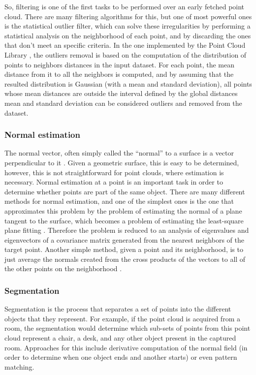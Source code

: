 \documentclass[msc, a4paper, classic, en]{ufbathesis}
\begin{document}
So, filtering is one of the first tasks to be performed over an early fetched point cloud. There are many filtering algorithms for this, but one of most powerful ones is the statistical outlier filter, which can solve these irregularities by performing a statistical analysis on the neighborhood of each point, and by discarding the ones that don't meet an specific criteria. In the one implemented by the Point Cloud Library \cite{pclstatout}, the outliers removal is based on the computation of the distribution of points to neighbors distances in the input dataset. For each point, the mean distance from it to all the neighbors is computed, and by assuming that the resulted distribution is Gaussian (with a mean and standard deviation), all points whose mean distances are outside the interval defined by the global distances mean and standard deviation can be considered outliers and removed from the dataset.

\subsubsection{Normal estimation}

The normal vector, often simply called the ``normal'' to a surface is a vector perpendicular to it \cite{normalwolf}. Given a geometric surface, this is easy to be determined, however, this is not straightforward for point clouds, where estimation is necessary. Normal estimation at a point is an important task in order to determine whether points are part of the same object. There are many different methods for normal estimation, and one of the simplest ones is the one that approximates this problem by the problem of estimating the normal of a plane tangent to the surface, which becomes a problem of estimating the least-square plane fitting \cite{pclnormal}. Therefore the problem is reduced to an analysis of eigenvalues and eigenvectors of a covariance matrix generated from the nearest neighbors of the target point. Another simple method, given a point and its neighborhood, is to just average the normals created from the cross products of the vectors to all of the other points on the neighborhood \cite{price2012}.

\subsubsection{Segmentation}

Segmentation is the process that separates a set of points into the different objects that they represent. For example, if the point cloud is acquired from a room, the segmentation would determine which sub-sets of points from this point cloud represent a chair, a desk, and any other object present in the captured room. Approaches for this include derivative computation of the normal field (in order to determine when one object ends and another starts) or even pattern matching.
\end{document}
